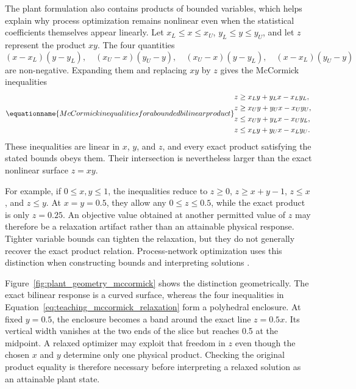 The plant formulation also contains products of bounded variables, which helps explain why process optimization remains nonlinear even when the statistical coefficients themselves appear linearly. Let $x_L\leq x\leq x_U$, $y_L\leq y\leq y_U$, and let $z$ represent the product $xy$. The four quantities
\[
(x-x_L)(y-y_L),\quad (x_U-x)(y_U-y),\quad
(x_U-x)(y-y_L),\quad (x-x_L)(y_U-y)
\]
are non-negative. Expanding them and replacing $xy$ by $z$ gives the McCormick inequalities \citep{McCormick1976}
\begin{equation}
\equationname{McCormick inequalities for a bounded bilinear product}
\begin{aligned}
z&\geq x_Ly+y_Lx-x_Ly_L,\\
z&\geq x_Uy+y_Ux-x_Uy_U,\\
z&\leq x_Uy+y_Lx-x_Uy_L,\\
z&\leq x_Ly+y_Ux-x_Ly_U.
\end{aligned}
\label{eq:teaching_mccormick_relaxation}
\end{equation}
These inequalities are linear in $x$, $y$, and $z$, and every exact product satisfying the stated bounds obeys them. Their intersection is nevertheless larger than the exact nonlinear surface $z=xy$.

For example, if $0\leq x,y\leq1$, the inequalities reduce to $z\geq0$, $z\geq x+y-1$, $z\leq x$, and $z\leq y$. At $x=y=0.5$, they allow any $0\leq z\leq0.5$, while the exact product is only $z=0.25$. An objective value obtained at another permitted value of $z$ may therefore be a relaxation artifact rather than an attainable physical response. Tighter variable bounds can tighten the relaxation, but they do not generally recover the exact product relation. Process-network optimization uses this distinction when constructing bounds and interpreting solutions \citep{RubioCastro2013,YangNetwork2014}.

Figure~\ref{fig:plant_geometry_mccormick} shows the distinction geometrically. The exact bilinear response is a curved surface, whereas the four inequalities in Equation~\eqref{eq:teaching_mccormick_relaxation} form a polyhedral enclosure. At fixed $y=0.5$, the enclosure becomes a band around the exact line $z=0.5x$. Its vertical width vanishes at the two ends of the slice but reaches 0.5 at the midpoint. A relaxed optimizer may exploit that freedom in $z$ even though the chosen $x$ and $y$ determine only one physical product. Checking the original product equality is therefore necessary before interpreting a relaxed solution as an attainable plant state.


